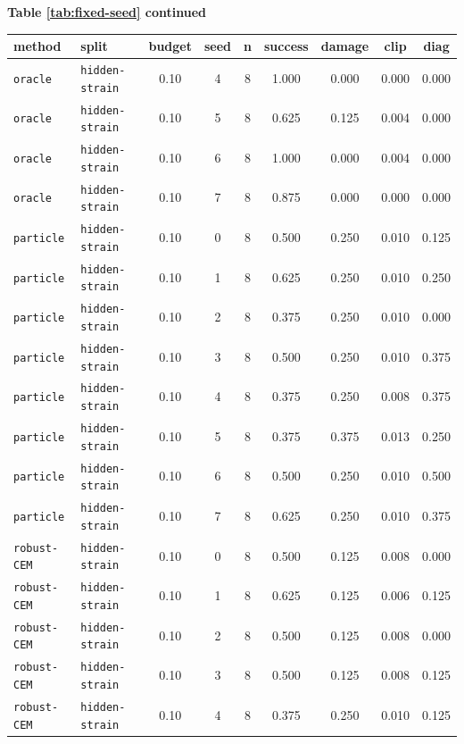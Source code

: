 \documentclass{article}
\begin{document}
\begin{center}
\textbf{Table \ref{tab:fixed-seed} continued}\\[0.4ex]
\begin{tabular}{llccccccc}
\toprule
method & split & budget & seed & n & success & damage & clip & diag \\
\midrule
\texttt{oracle} & \texttt{hidden-strain} & 0.10 & 4 & 8 & 1.000 & 0.000 & 0.000 & 0.000 \\
\texttt{oracle} & \texttt{hidden-strain} & 0.10 & 5 & 8 & 0.625 & 0.125 & 0.004 & 0.000 \\
\texttt{oracle} & \texttt{hidden-strain} & 0.10 & 6 & 8 & 1.000 & 0.000 & 0.004 & 0.000 \\
\texttt{oracle} & \texttt{hidden-strain} & 0.10 & 7 & 8 & 0.875 & 0.000 & 0.000 & 0.000 \\
\texttt{particle} & \texttt{hidden-strain} & 0.10 & 0 & 8 & 0.500 & 0.250 & 0.010 & 0.125 \\
\texttt{particle} & \texttt{hidden-strain} & 0.10 & 1 & 8 & 0.625 & 0.250 & 0.010 & 0.250 \\
\texttt{particle} & \texttt{hidden-strain} & 0.10 & 2 & 8 & 0.375 & 0.250 & 0.010 & 0.000 \\
\texttt{particle} & \texttt{hidden-strain} & 0.10 & 3 & 8 & 0.500 & 0.250 & 0.010 & 0.375 \\
\texttt{particle} & \texttt{hidden-strain} & 0.10 & 4 & 8 & 0.375 & 0.250 & 0.008 & 0.375 \\
\texttt{particle} & \texttt{hidden-strain} & 0.10 & 5 & 8 & 0.375 & 0.375 & 0.013 & 0.250 \\
\texttt{particle} & \texttt{hidden-strain} & 0.10 & 6 & 8 & 0.500 & 0.250 & 0.010 & 0.500 \\
\texttt{particle} & \texttt{hidden-strain} & 0.10 & 7 & 8 & 0.625 & 0.250 & 0.010 & 0.375 \\
\texttt{robust-CEM} & \texttt{hidden-strain} & 0.10 & 0 & 8 & 0.500 & 0.125 & 0.008 & 0.000 \\
\texttt{robust-CEM} & \texttt{hidden-strain} & 0.10 & 1 & 8 & 0.625 & 0.125 & 0.006 & 0.125 \\
\texttt{robust-CEM} & \texttt{hidden-strain} & 0.10 & 2 & 8 & 0.500 & 0.125 & 0.008 & 0.000 \\
\texttt{robust-CEM} & \texttt{hidden-strain} & 0.10 & 3 & 8 & 0.500 & 0.125 & 0.008 & 0.125 \\
\texttt{robust-CEM} & \texttt{hidden-strain} & 0.10 & 4 & 8 & 0.375 & 0.250 & 0.010 & 0.125 \\

\end{tabular}
\end{center}
\end{document}
